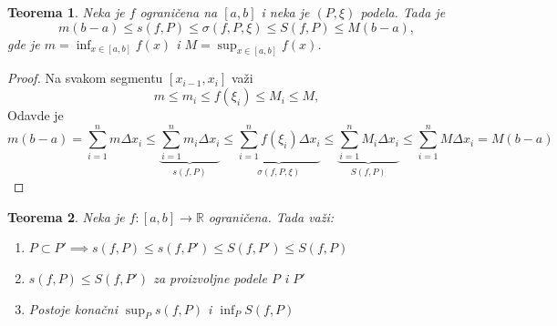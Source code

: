 \documentclass[a4paper,12pt,twoside]{report}
\newtheorem{theorem}{Teorema}[section]
\numberwithin{algorithm}{section}
\begin{document}
\begin{theorem}
    Neka je $f$ ograničena na $[a, b]$ i neka je $(P, \xi)$ podela. Tada je
    \[
        m(b-a) \leq s(f, P) \leq \sigma(f, P, \xi) \leq S(f, P) \leq M(b-a),
    \]
    gde je $\displaystyle m = \inf_{x \in [a, b]} f(x)$ i $\displaystyle M = \sup_{x \in [a, b]} f(x)$.
\end{theorem}

\begin{proof}
     Na svakom segmentu $[x_{i-1}, x_i]$ važi
    \[
        m \leq m_i \leq f(\xi_i) \leq M_i \leq M,
    \]
    Odavde je
    \[
        m(b-a) = \sum_{i=1}^{n} m \Delta x_i \leq \underbrace{\sum_{i=1}^{n} m_i \Delta x_i}_{s(f, P)} \leq \underbrace{\sum_{i=1}^{n} f(\xi_i) \Delta x_i}_{\sigma(f, P, \xi)} \leq \underbrace{\sum_{i=1}^{n} M_i \Delta x_i}_{S(f, P)} \leq \sum_{i=1}^{n} M \Delta x_i = M(b-a)
    \]
\end{proof}

\begin{theorem}
    Neka je $f: [a, b] \to \mathbb{R}$ ograničena. Tada važi:
    \begin{enumerate}[label=\alph*)]
        \item $P \subset P' \implies s(f, P) \leq s(f, P') \leq S(f, P') \leq S(f, P)$
        \item $s(f, P) \leq S(f, P')$ za proizvoljne podele $P$ i $P'$
        \item Postoje konačni $\displaystyle \sup_P s(f, P)$ i $\displaystyle \inf_P S(f, P)$
    \end{enumerate}
\end{theorem}
\end{document}
